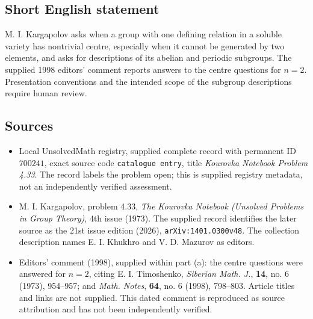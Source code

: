 \documentclass[11pt]{article}
\begin{document}
\subsection{Short English statement}
M. I. Kargapolov asks when a group with one defining relation in a soluble variety has nontrivial centre, especially when it cannot be generated by two elements, and asks for descriptions of its abelian and periodic subgroups. The supplied 1998 editors' comment reports answers to the centre questions for \(n=2\). Presentation conventions and the intended scope of the subgroup descriptions require human review.
\subsection{Sources}
\begin{itemize}
\item Local UnsolvedMath registry, supplied complete record with permanent ID \(700241\), exact source code \texttt{catalogue entry}, title \emph{Kourovka Notebook Problem 4.33}. The record labels the problem open; this is supplied registry metadata, not an independently verified assessment.
\item M. I. Kargapolov, problem 4.33, \emph{The Kourovka Notebook (Unsolved Problems in Group Theory)}, 4th issue (1973). The supplied record identifies the later source as the 21st issue edition (2026), \texttt{arXiv:1401.0300v48}. The collection description names E. I. Khukhro and V. D. Mazurov as editors.
\item Editors' comment (1998), supplied within part (a): the centre questions were answered for \(n=2\), citing E. I. Timoshenko, \emph{Siberian Math. J.}, \textbf{14}, no. 6 (1973), 954--957; and \emph{Math. Notes}, \textbf{64}, no. 6 (1998), 798--803. Article titles and links are not supplied. This dated comment is reproduced as source attribution and has not been independently verified.
\end{itemize}
\end{document}

